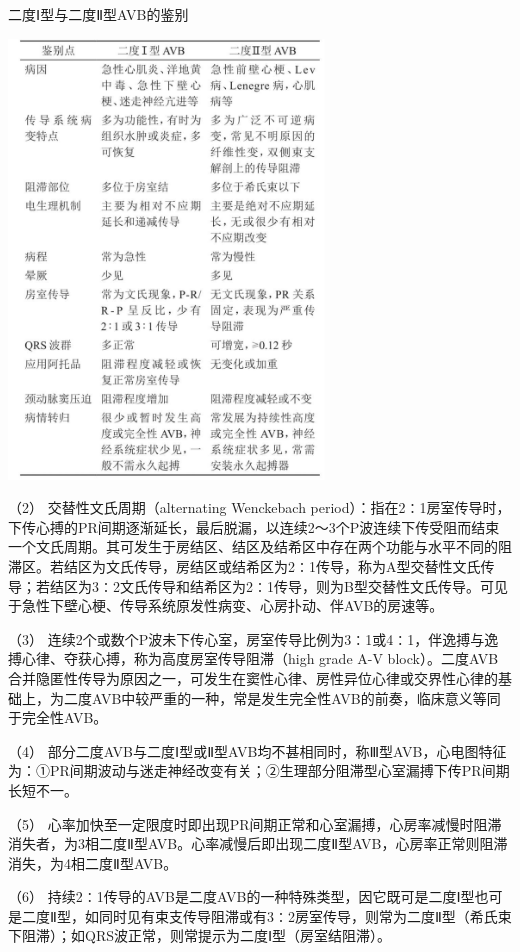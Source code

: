 \begin{table}[htbp]
\centering
\caption{二度Ⅰ型与二度Ⅱ型AVB的鉴别}
\label{tab102-19}
\includegraphics[width=3.30208in,height=4.59375in]{./images/Image00460.jpg}
\end{table}

（2） 交替性文氏周期（alternating Wenckebach
period）：指在2∶1房室传导时，下传心搏的PR间期逐渐延长，最后脱漏，以连续2～3个P波连续下传受阻而结束一个文氏周期。其可发生于房结区、结区及结希区中存在两个功能与水平不同的阻滞区。若结区为文氏传导，房结区或结希区为2∶1传导，称为A型交替性文氏传导；若结区为3∶2文氏传导和结希区为2∶1传导，则为B型交替性文氏传导。可见于急性下壁心梗、传导系统原发性病变、心房扑动、伴AVB的房速等。

（3）
连续2个或数个P波未下传心室，房室传导比例为3∶1或4∶1，伴逸搏与逸搏心律、夺获心搏，称为高度房室传导阻滞（high
grade A-V
block）。二度AVB合并隐匿性传导为原因之一，可发生在窦性心律、房性异位心律或交界性心律的基础上，为二度AVB中较严重的一种，常是发生完全性AVB的前奏，临床意义等同于完全性AVB。

（4）
部分二度AVB与二度Ⅰ型或Ⅱ型AVB均不甚相同时，称Ⅲ型AVB，心电图特征为：①PR间期波动与迷走神经改变有关；②生理部分阻滞型心室漏搏下传PR间期长短不一。

（5）
心率加快至一定限度时即出现PR间期正常和心室漏搏，心房率减慢时阻滞消失者，为3相二度Ⅱ型AVB。心率减慢后即出现二度Ⅱ型AVB，心房率正常则阻滞消失，为4相二度Ⅱ型AVB。

（6）
持续2∶1传导的AVB是二度AVB的一种特殊类型，因它既可是二度Ⅰ型也可是二度Ⅱ型，如同时见有束支传导阻滞或有3∶2房室传导，则常为二度Ⅱ型（希氏束下阻滞）；如QRS波正常，则常提示为二度Ⅰ型（房室结阻滞）。


